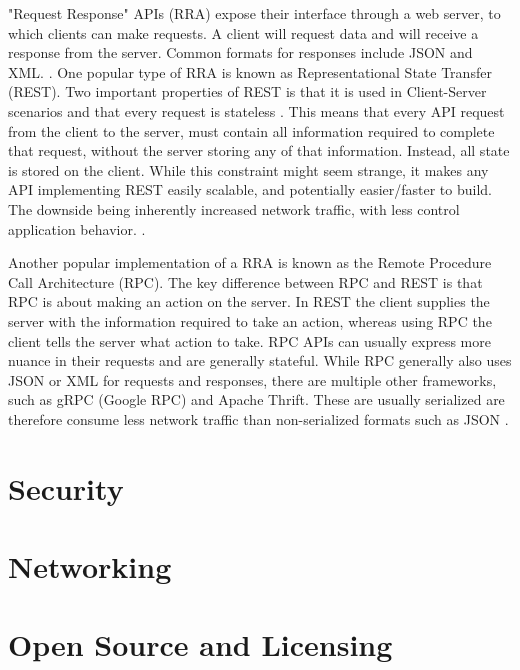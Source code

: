 "Request Response" APIs (RRA) expose their interface through a web server, to which clients can make requests. A client will request data and will receive a response from the server. Common formats for responses include JSON and XML. \cite{DesigningWebApis}. One popular type of RRA is known as Representational State Transfer (REST). Two important properties of REST is that it is used in Client-Server scenarios and that every request is stateless \cite{ArchitecturalStylesAPIs}. This means that every API request from the client to the server, must contain all information required to complete that request, without the server storing any of that information. Instead, all state is stored on the client. While this constraint might seem strange, it makes any API implementing REST easily scalable, and potentially easier/faster to build. The downside being inherently increased network traffic, with less control application behavior. \cite{ArchitecturalStylesAPIs}.

Another popular implementation of a RRA is known as the Remote Procedure Call Architecture (RPC). The key difference between RPC and REST is that RPC is about making an action on the server. In REST the client supplies the server with the information required to take an action, whereas using RPC the client tells the server what action to take. RPC APIs can usually express more nuance in their requests and are generally stateful. While RPC generally also uses JSON or XML for requests and responses, there are multiple other frameworks, such as gRPC (Google RPC) and Apache Thrift. These are usually serialized are therefore consume less network traffic than non-serialized formats such as JSON \cite{DesigningWebApis}. 

\section{Security} \label{sec:chap2:security}
\section{Networking} \label{sec:chap2:networking}
\section{Open Source and Licensing} \label{sec:chap2:opensource}

